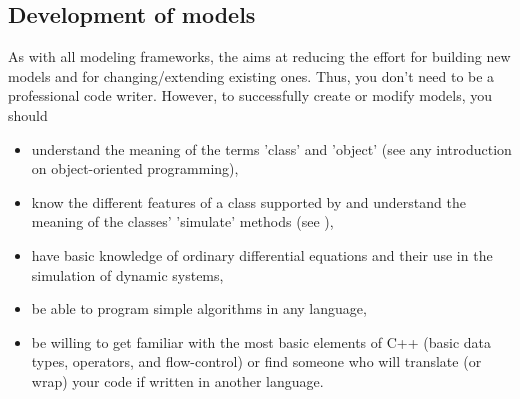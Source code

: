 \subsection{Development of models} \label{sec:intro_skills-dev}

As with all modeling frameworks, the  aims at reducing the effort for building new models and for changing/extending existing ones. Thus, you don't need to be a professional code writer. However, to successfully create or modify models, you should
\begin{itemize}
  \item understand the meaning of the terms 'class' and 'object' (see any introduction on object-oriented programming),
  \item know the different features of a class supported by  and understand the meaning of the classes' 'simulate' methods (see ),
  \item have basic knowledge of ordinary differential equations and their use in the simulation of dynamic systems,
  \item be able to program simple algorithms in any language,
  \item be willing to get familiar with the most basic elements of C++ (basic data types, operators, and flow-control) or find someone who will translate (or wrap) your code if written in another language.
\end{itemize}
